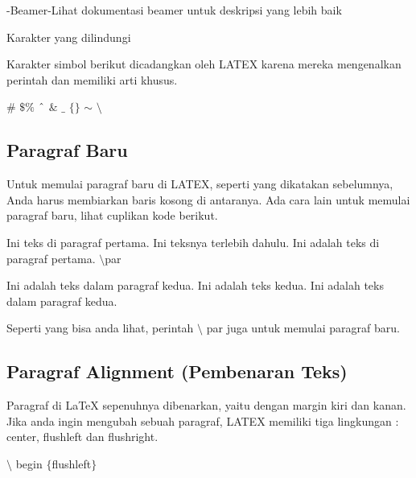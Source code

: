 \begin{itemize}
-Beamer\hspace*{0.5in}-Lihat dokumentasi beamer untuk deskripsi yang lebih baik\par
\vspace{\baselineskip}
Karakter yang dilindungi\par
\vspace{\baselineskip}
Karakter simbol berikut dicadangkan oleh LATEX karena mereka mengenalkan perintah dan memiliki arti khusus.\par

$\#$ $\$$$\%$ $ \string^ $ $\&$ $ \_ $ $ \{ $$ \} $ $ \sim $ $\setminus$\par

\vspace{10pt}
	\subsection{Paragraf Baru}

Untuk memulai paragraf baru di LATEX, seperti yang dikatakan sebelumnya, Anda harus membiarkan baris kosong di antaranya. Ada cara lain untuk memulai paragraf baru, lihat cuplikan kode berikut.\par
\vspace{\baselineskip}
Ini teks di paragraf pertama. Ini teksnya terlebih dahulu. Ini adalah teks di paragraf pertama. $\setminus$par\par
\vspace{\baselineskip}
Ini adalah teks dalam paragraf kedua. Ini adalah teks kedua. Ini adalah teks dalam paragraf kedua.\par

Seperti yang bisa anda lihat, perintah $\setminus$ par juga untuk memulai paragraf baru.\par

\vspace{10pt}
	\subsection{Paragraf Alignment (Pembenaran Teks)}

Paragraf di LaTeX sepenuhnya dibenarkan, yaitu dengan margin kiri dan kanan. Jika anda ingin mengubah sebuah paragraf, LATEX memiliki tiga lingkungan : center, flushleft dan flushright.\par
\vspace{\baselineskip}
\hspace*{0.5in}$\setminus$ begin $ \{ $flushleft$ \} $\par


\end{itemize}
